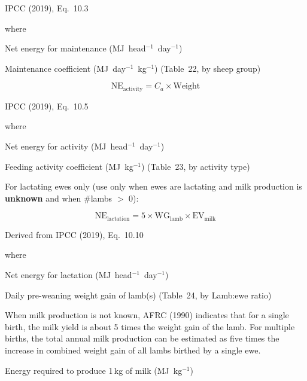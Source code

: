\noindent IPCC (2019), Eq.~10.3

\noindent where
\begin{description}[font=\normalfont, leftmargin=9em, style=sameline, nosep]
    \item[$\mathrm{NE}_{\mathrm{maintenance}}$] Net energy for maintenance
          (MJ~head$^{-1}$~day$^{-1}$)
    \item[$C_f$] Maintenance coefficient (MJ~day$^{-1}$~kg$^{-1}$) (Table~22,
          by sheep group)
\end{description}

\begin{equation}
    \mathrm{NE}_{\mathrm{activity}} = C_a \times \mathrm{Weight}
    \tag{Eq.\ 3.3.1.4}
\end{equation}

\noindent IPCC (2019), Eq.~10.5

\noindent where
\begin{description}[font=\normalfont, leftmargin=9em, style=sameline, nosep]
    \item[$\mathrm{NE}_{\mathrm{activity}}$] Net energy for activity
          (MJ~head$^{-1}$~day$^{-1}$)
    \item[$C_a$] Feeding activity coefficient (MJ~kg$^{-1}$) (Table~23,
          by activity type)
\end{description}

\noindent For lactating ewes only (use only when ewes are lactating and milk
production is \textbf{unknown} and when \#lambs $>$ 0):

\begin{equation}
    \mathrm{NE}_{\mathrm{lactation}} =
        5 \times \mathrm{WG}_{\mathrm{lamb}} \times \mathrm{EV}_{\mathrm{milk}}
    \tag{Eq.\ 3.3.1.5}
\end{equation}

\noindent Derived from IPCC (2019), Eq.~10.10

\noindent where
\begin{description}[font=\normalfont, leftmargin=9em, style=sameline, nosep]
    \item[$\mathrm{NE}_{\mathrm{lactation}}$] Net energy for lactation
          (MJ~head$^{-1}$~day$^{-1}$)
    \item[$\mathrm{WG}_{\mathrm{lamb}}$] Daily pre-weaning weight gain of lamb(s)
          (Table~24, by Lamb:ewe ratio)
    \item[$5$] When milk production is not known, AFRC (1990) indicates that for a
          single birth, the milk yield is about 5 times the weight gain of the lamb.
          For multiple births, the total annual milk production can be estimated as
          five times the increase in combined weight gain of all lambs birthed by a
          single ewe.
    \item[$\mathrm{EV}_{\mathrm{milk}}$] Energy required to produce 1\,kg of milk
          (MJ~kg$^{-1}$)
\end{description}

